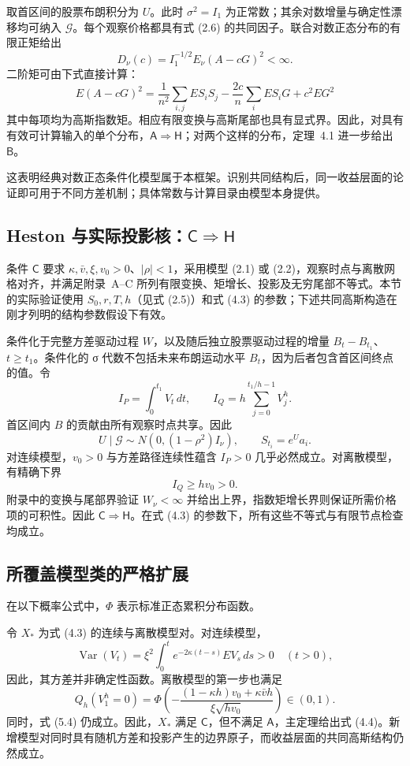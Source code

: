 取首区间的股票布朗积分为 \(U\)。此时 \(\sigma^2=I_1\) 为正常数；其余对数增量与确定性漂移均可纳入 \(\mathcal G\)。每个观察价格都具有式 (2.6) 的共同因子。联合对数正态分布的有限正矩给出
\[
D_\nu(c)=I_1^{-1/2}E_\nu(A-cG)^2<\infty.
\]
二阶矩可由下式直接计算：
\[
E(A-cG)^2=\frac1{n^2}\sum_{i,j}ES_iS_j
-\frac{2c}{n}\sum_iES_iG+c^2EG^2
\tag{5.2}
\]
其中每项均为高斯指数矩。相应有限变换与高斯尾部也具有显式界。因此，对具有有效可计算输入的单个分布，\(\mathsf A\Rightarrow\mathsf H\)；对两个这样的分布，定理~4.1 进一步给出 \(\mathsf B\)。

这表明经典对数正态条件化模型属于本框架。识别共同结构后，同一收益层面的论证即可用于不同方差机制；具体常数与计算目录由模型本身提供。

\subsection{Heston 与实际投影核：\(\mathsf C\Rightarrow\mathsf H\)}

条件 \(\mathsf C\) 要求 \(\kappa,\bar v,\xi,v_0>0\)、\(|\rho|<1\)，采用模型 (2.1) 或 (2.2)，观察时点与离散网格对齐，并满足附录~A--C 所列有限变换、矩增长、投影及无穷尾部不等式。本节的实际验证使用 \(S_0,r,T,h\)（见式 (2.5)）和式 (4.3) 的参数；下述共同高斯构造在刚才列明的结构参数假设下有效。

条件化于完整方差驱动过程 \(W\)，以及随后独立股票驱动过程的增量 \(B_t-B_{t_1}\)、\(t\ge t_1\)。条件化的 σ 代数不包括未来布朗运动水平 \(B_t\)，因为后者包含首区间终点的值。令
\[
I_P=\int_0^{t_1}V_t\,dt,\qquad
I_Q=h\sum_{j=0}^{t_1/h-1}V_j^h.
\]
首区间内 \(B\) 的贡献由所有观察时点共享。因此
\[
U\mid\mathcal G\sim N(0,(1-\rho^2)I_\nu),\qquad S_{t_i}=e^Ua_i.
\tag{5.3}
\]
对连续模型，\(v_0>0\) 与方差路径连续性蕴含 \(I_P>0\) 几乎必然成立。对离散模型，有精确下界
\[
I_Q\ge hv_0>0.
\tag{5.4}
\]
附录中的变换与尾部界验证 \(W_\nu<\infty\) 并给出上界，指数矩增长界则保证所需价格项的可积性。因此 \(\mathsf C\Rightarrow\mathsf H\)。在式 (4.3) 的参数下，所有这些不等式与有限节点检查均成立。

\subsection{所覆盖模型类的严格扩展}

在以下概率公式中，\(\Phi\) 表示标准正态累积分布函数。

令 \(X_*\) 为式 (4.3) 的连续与离散模型对。对连续模型，
\[
\operatorname{Var}(V_t)=\xi^2\int_0^t e^{-2\kappa(t-s)}EV_s\,ds>0
\quad(t>0),
\tag{5.5}
\]
因此，其方差并非确定性函数。离散模型的第一步也满足
\[
Q_h(V_1^h=0)=
\Phi\!\left(
-\frac{(1-\kappa h)v_0+\kappa\bar v h}{\xi\sqrt{hv_0}}
\right)\in(0,1).
\tag{5.6}
\]
同时，式 (5.4) 仍成立。因此，\(X_*\) 满足 \(\mathsf C\)，但不满足 \(\mathsf A\)，主定理给出式 (4.4)。新增模型对同时具有随机方差和投影产生的边界原子，而收益层面的共同高斯结构仍然成立。


